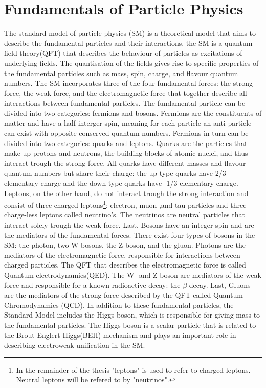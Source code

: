 \chapter{Fundamentals of Particle Physics}
 
The standard model of particle physics (SM) is a theoretical model that aims to describe the fundamental particles and their interactions. the SM is a quantum field theory(QFT) that describes the behaviour of particles as excitations of underlying fields. The quantisation of the fields gives rise to specific properties of the fundamental particles such as mass, spin, charge, and flavour quantum numbers. The SM incorporates three of the four fundamental forces: the strong force, the weak force, and the electromagnetic force that together describe all interactions between fundamental particles. The fundamental particle can be divided into two categories: fermions and bosons. Fermions are the constituents of matter and have a half-interger spin, meaning for each particle an anti-particle can exist with opposite conserved quantum numbers. Fermions in turn can be divided into two categories: quarks and leptons. Quarks are the particles that make up protons and neutrons, the building blocks of atomic nuclei, and thus interact trough the strong force. All quarks have different masses and flavour quantum numbers but share their charge: the up-type quarks have 2/3 elementary charge and the down-type quarks have -1/3 elementary charge.  Leptons, on the other hand, do not interact trough the strong interaction and consist of three charged leptons\footnote{In the remainder of the thesis "leptons" is used to refer to charged leptons. Neutral leptons will be refered to by "neutrinos".}: electron, muon ,and tau particles and three charge-less leptons called neutrino's. The neutrinos are neutral particles that interact solely trough the weak force. Last, Bosons have an integer spin and are the mediators of the fundamental forces. There exist four types of bosons in the SM: the photon, two W bosons, the Z boson, and the gluon. Photons are the mediators of the electromagnetic force, responsible for interactions between charged particles. The QFT that describes the electromagnetic force is called Quantum electrodynamics(QED). The W- and Z-boson are mediators of the weak force and responsible for a known radioactive decay: the $\beta$-decay. Last, Gluons are the mediators of the strong force described by the QFT called  Quantum Chromodynamics (QCD). In addition to these fundamental particles, the Standard Model includes the Higgs boson, which is responsible for giving mass to the fundamental particles. The Higgs boson is a scalar particle that is related to the Brout-Englert-Higgs(BEH) mechanism and plays an important role in describing electroweak unification in the SM.